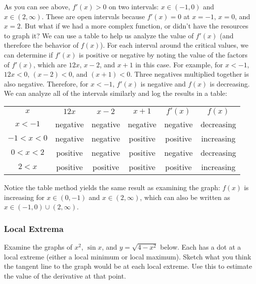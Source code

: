 As you can see above, $f'(x)>0$ on two intervals: $x \in (-1, 0) $ and $x \in (2, \infty)$. These are open intervals because $f'(x)=0$ at $x=-1$, $x=0$, and $x=2$. But what if we had a more complex function, or didn't have the resources to graph it? We can use a table to help us analyze the value of $f'(x)$ (and therefore the behavior of $f(x)$). For each interval around the critical values, we can determine if $f'(x)$ is positive or negative by noting the value of the factors of $f'(x)$, which are $12x$, $x-2$, and $x+1$ in this case. For example, for $x<-1$, $12x<0$, $(x-2)<0$, and $(x+1)<0$. Three negatives multiplied together is also negative. Therefore, for $x<-1$, $f'(x)$ is negative and $f(x)$ is decreasing. We can analyze all of the intervals similarly and log the results in a table:

\begin{tabular}{c | c | c |c|c|c}
\hline
$x$ & $12x$ & $x-2$ & $x+1$ & $f'(x)$ & $f(x)$ \\
$x<-1$ & negative & negative & negative & negative &decreasing\\
$-1<x<0$ & negative & negative & positive & positive & increasing \\
$0<x<2$ & positive & negative & positive & negative & decreasing \\
$2<x$ & positive & positive & positive & positive & increasing\\
\end{tabular}

Notice the table method yields the same result as examining the graph: $f(x)$ is increasing for $x\in (0, -1)$ and $x \in (2, \infty)$, which can also be written as $x \in (-1, 0) \cup (2, \infty)$. 

\subsubsection{Local Extrema}
Examine the graphs of $x^2$, $\sin{x}$, and $y=\sqrt{4-x^2}$ below. Each has a dot at a local extreme (either a local minimum or local maximum). Sketch what you think the tangent line to the graph would be at each local extreme. Use this to estimate the value of the derivative at that point. 


